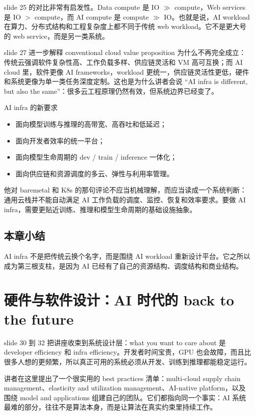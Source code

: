 \documentclass[a4paper]{article}
\begin{document}
slide 25 的对比非常有启发性。Data compute 是 IO \(\gg\) compute，Web services 是 IO \(>\) compute，而 AI compute 是 compute \(\gg\) IO。也就是说，AI workload 在算力、分布式结构和工程复杂度上都不同于传统 web workload。它不是更大号的 web service，而是另一类系统。

slide 27 进一步解释 conventional cloud value proposition 为什么不再完全成立：传统云强调软件复杂性高、工作负载多样、供应链灵活和 VM 高可互换；而 AI cloud 里，软件更像 AI frameworks，workload 更统一，供应链灵活性更低，硬件和系统更像为单一类任务深度定制。这也是为什么讲者会说 ``AI infra is different, but also the same''：很多云工程原理仍然有效，但系统边界已经变了。

\begin{knowledgebox}{AI infra 的新要求}
\begin{itemize}
    \item 面向模型训练与推理的高带宽、高吞吐和低延迟；
    \item 面向开发者效率的统一平台；
    \item 面向模型生命周期的 dev / train / inference 一体化；
    \item 面向供应链和资源调度的多云、弹性与利用率管理。
\end{itemize}
\end{knowledgebox}

他对 baremetal 和 K8s 的那句评论不应当机械理解，而应当读成一个系统判断：通用云栈并不能自动满足 AI 工作负载的调度、监控、恢复和效率要求。要做 AI infra，需要更贴近训练、推理和模型生命周期的基础设施抽象。

\subsection{本章小结}
AI infra 不是把传统云换个名字，而是围绕 AI workload 重新设计平台。它之所以成为第三根支柱，是因为 AI 已经有了自己的资源结构、调度结构和商业结构。

\section{硬件与软件设计：AI 时代的 back to the future}
slide 30 到 32 把讲座收束到系统设计层：what you want to care about 是 developer efficiency 和 infra efficiency。开发者时间宝贵，GPU 也会故障，而且比很多人想的更频繁，所以真正可用的系统必须从开发、训练到推理都能稳定运行。

讲者在这里提出了一个很实用的 best practices 清单：multi-cloud supply chain management、elasticity and utilization management、AI-native platform，以及围绕 model and applications 组建自己的团队。它们都指向同一个事实：AI 系统最难的部分，往往不是算法本身，而是让算法在真实约束里持续工作。
\end{document}
